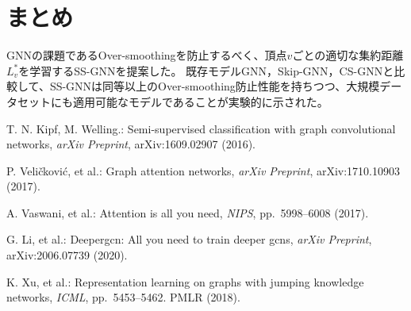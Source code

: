 \documentclass[a4j,twocolumn]{jsarticle}
\begin{document}
\section{まとめ}
GNNの課題であるOver-smoothingを防止するべく、頂点$v$ごとの適切な集約距離$L_v^*$を学習するSS-GNNを提案した。
既存モデルGNN，Skip-GNN，CS-GNNと比較して、SS-GNNは同等以上のOver-smoothing防止性能を持ちつつ、大規模データセットにも適用可能なモデルであることが実験的に示された。




\renewcommand{\bibname}{参考文献}
\begin{thebibliography}{1}
\vspace{-2mm}

T. N. Kipf, M. Welling.:
Semi-supervised classification with graph convolutional networks,
{\it arXiv Preprint}, arXiv:1609.02907 (2016).
\vspace{-0.3mm}

P. Veli{\v{c}}kovi{\'c}, et al.:
Graph attention networks,
{\it arXiv Preprint}, arXiv:1710.10903 (2017).
\vspace{-0.3mm}

A. Vaswani, et al.:
Attention is all you need,
{\it NIPS}, pp.~5998--6008 (2017).
\vspace{-0.3mm}

G. Li, et al.:
Deepergcn: All you need to train deeper gcns,
{\it arXiv Preprint}, arXiv:2006.07739 (2020).
\vspace{-0.3mm}

K. Xu, et al.:
Representation learning on graphs with jumping knowledge networks,
{\it ICML}, pp.~5453--5462. PMLR (2018).
\vspace{-0.3mm}

\end{thebibliography}
\end{document}
